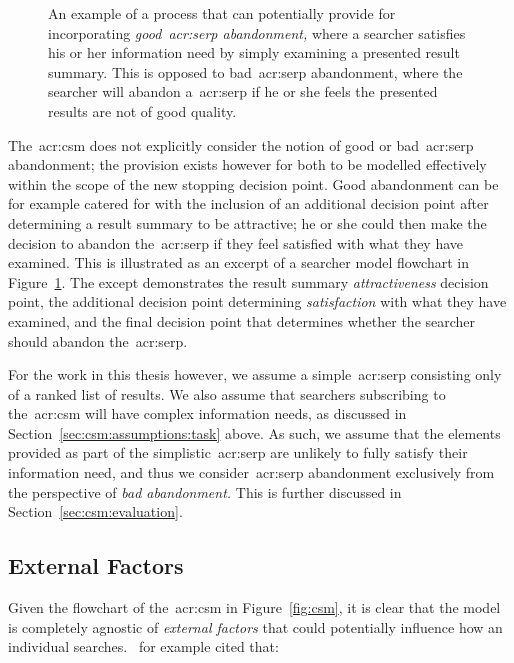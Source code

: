 \begin{figure}[t!]
    \centering
    \caption[Good abandonment flowchart]{An example of a process that can potentially provide for incorporating \emph{good~\gls{acr:serp} abandonment,} where a searcher satisfies his or her information need by simply examining a presented result summary. This is opposed to bad~\gls{acr:serp} abandonment, where the searcher will abandon a~\gls{acr:serp} if he or she feels the presented results are not of good quality.}
    \label{fig:good}
\end{figure}

The~\gls{acr:csm} does not explicitly consider the notion of good or bad~\gls{acr:serp} abandonment; the provision exists however for both to be modelled effectively within the scope of the new stopping decision point. Good abandonment can be for example catered for with the inclusion of an additional decision point after determining a result summary to be attractive; he or she could then make the decision to abandon the~\gls{acr:serp} if they feel satisfied with what they have examined. This is illustrated as an excerpt of a searcher model flowchart in Figure~\ref{fig:good}. The except demonstrates the result summary \emph{attractiveness} decision point, the additional decision point determining \emph{satisfaction} with what they have examined, and the final decision point that determines whether the searcher should abandon the~\gls{acr:serp}.

For the work in this thesis however, we assume a simple~\gls{acr:serp} consisting only of a ranked list of results. We also assume that searchers subscribing to the~\gls{acr:csm} will have complex information needs, as discussed in Section~\ref{sec:csm:assumptions:task} above. As such, we assume that the elements provided as part of the simplistic~\gls{acr:serp} are unlikely to fully satisfy their information need, and thus we consider~\gls{acr:serp} abandonment exclusively from the perspective of \emph{bad abandonment.} This is further discussed in Section~\ref{sec:csm:evaluation}.

\subsection{External Factors}
Given the flowchart of the~\gls{acr:csm} in Figure~\ref{fig:csm}, it is clear that the model is completely agnostic of \emph{external factors} that could potentially influence how an individual searches.~\cite{kelly2009iir} for example cited that:

